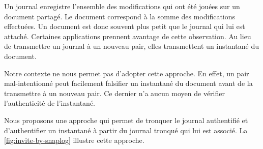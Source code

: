 Un journal enregistre l'ensemble des modifications qui ont été jouées sur un document partagé.
Le document correspond à la somme des modifications effectuées.
Un document est donc souvent plus petit que le journal qui lui est attaché.
Certaines applications prennent avantage de cette observation.
Au lieu de transmettre un journal à un nouveau pair, elles transmettent un instantané du document.

Notre contexte ne nous permet pas d'adopter cette approche.
En effet, un pair mal-intentionné peut facilement falsifier un instantané du document avant de la transmettre à un nouveau pair.
Ce dernier n'a aucun moyen de vérifier l'authenticité de l'instantané.

Nous proposons une approche qui permet de tronquer le journal authentifié et d'authentifier un instantané à partir du journal tronqué qui lui est associé.
La \autoref{fig:invite-by-snaplog} illustre cette approche.

